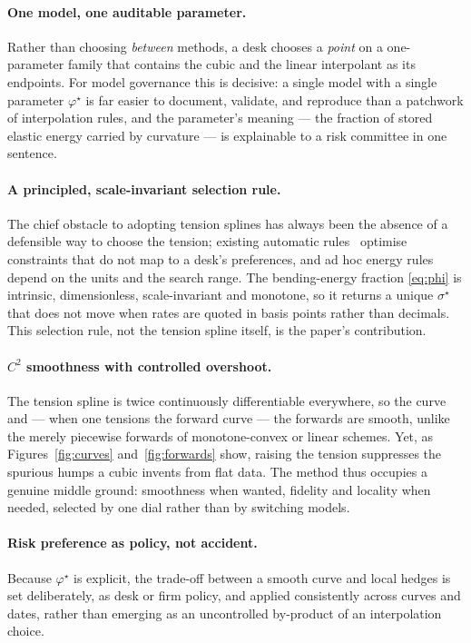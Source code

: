 \documentclass[]{interact}
\theoremstyle{plain}
\begin{document}
\paragraph{One model, one auditable parameter.} Rather than choosing \emph{between} methods, a
desk chooses a \emph{point} on a one-parameter family that contains the cubic and the linear
interpolant as its endpoints. For model governance this is decisive: a single model with a
single parameter $\varphi^\star$ is far easier to document, validate, and reproduce than a
patchwork of interpolation rules, and the parameter's meaning --- the fraction of stored
elastic energy carried by curvature --- is explainable to a risk committee in one sentence.

\paragraph{A principled, scale-invariant selection rule.} The chief obstacle to adopting
tension splines has always been the absence of a defensible way to choose the tension; existing
automatic rules~\cite{Renka} optimise constraints that do not map to a desk's preferences, and
ad hoc energy rules depend on the units and the search range. The bending-energy fraction
\eqref{eq:phi} is intrinsic, dimensionless, scale-invariant and monotone, so it returns a unique
$\sigma^\star$ that does not move when rates are quoted in basis points rather than decimals.
This selection rule, not the tension spline itself, is the paper's contribution.

\paragraph{$C^2$ smoothness with controlled overshoot.} The tension spline is twice
continuously differentiable everywhere, so the curve and --- when one tensions the forward
curve --- the forwards are smooth, unlike the merely piecewise forwards of monotone-convex or
linear schemes. Yet, as Figures~\ref{fig:curves} and~\ref{fig:forwards} show, raising the
tension suppresses the spurious humps a cubic invents from flat data. The method thus occupies
a genuine middle ground: smoothness when wanted, fidelity and locality when needed, selected by
one dial rather than by switching models.

\paragraph{Risk preference as policy, not accident.} Because $\varphi^\star$ is explicit, the
trade-off between a smooth curve and local hedges is set deliberately, as desk or firm policy,
and applied consistently across curves and dates, rather than emerging as an uncontrolled
by-product of an interpolation choice.
\end{document}
